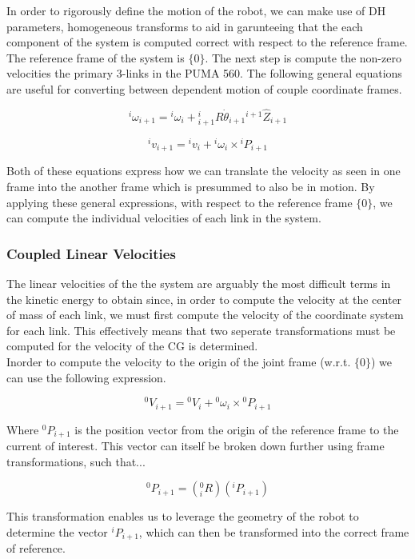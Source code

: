 \noindent In order to rigorously define the motion of the robot, we can make use of DH parameters, homogeneous transforms to aid in garunteeing that the each component of the system is computed correct with respect to the reference frame. The reference frame of the system is $\{ 0 \}$. The next step is compute the non-zero velocities the primary 3-links in the PUMA 560. The following general equations are useful for converting between dependent motion of couple coordinate frames.



$$
{}^{i}\omega_{i+1}={ }^{i} \omega_{i}+{ }_{i+1}^{i} R \dot{\theta}_{i+1}{ }^{i+1} \hat{Z}_{i+1}
$$


$$
{}^{i}v_{i+1}={ }^{i} v_{i}+{ }^{i} \omega_{i} \times{ }^{i} P_{i+1}
$$



\noindent Both of these equations express how we can translate the velocity as seen in one frame into the another frame which is presummed to also be in motion. By applying these general expressions, with respect to the reference frame $\{ 0\}$, we can compute the individual velocities of each link in the system.


\subsubsection*{Coupled Linear Velocities}

The linear velocities of the the system are arguably the most difficult terms in the kinetic energy to obtain since, in order to compute the velocity at the center of mass of each link, we must first compute the velocity of the coordinate system for each link. This effectively means that two seperate transformations must be computed for the velocity of the CG is determined. \\

\noindent Inorder to compute the velocity to the origin of the joint frame (w.r.t. $\{ 0 \}$) we can use the following expression.

$$
{}^{0}V_{i+1} = {}^{0}V_{i} + {}^{0}\omega_{i} \times {}^{0}P_{i+1}
$$

\noindent Where ${}^{0}P_{i+1}$ is the position vector from the origin of the reference frame to the current of interest. This vector can itself be broken down further using frame transformations, such that...

$$
{}^{0}P_{i+1} = \left( {}^{0}_{i}R \right) \left({}^{i}P_{i+1}\right)
$$

\noindent This transformation enables us to leverage the geometry of the robot to determine the vector ${}^{i}P_{i+1}$, which can then be transformed into the correct frame of reference. \\

